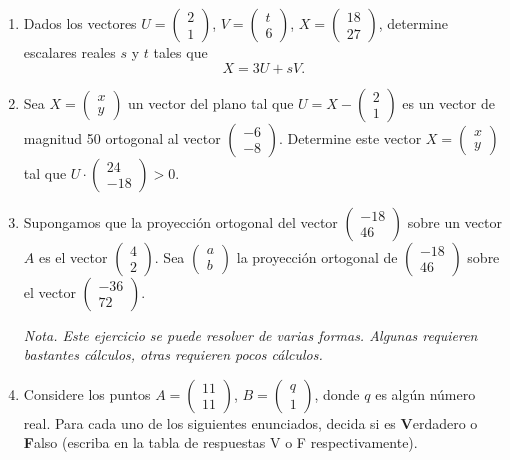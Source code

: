 \documentclass[11pt]{article}
\newcommand{\vect}[2]{\begin{pmatrix}#1\\#2\end{pmatrix}}
\newcommand{\nota}[1]{{\small\itshape\color{unalblue!70!black} #1}}
\begin{document}
\begin{enumerate}
\item Dados los vectores $U=\vect{2}{1}$, $V=\vect{t}{6}$, $X=\vect{18}{27}$, determine escalares reales $s$ y $t$ tales que
$$X=3U+sV.$$


\item Sea $X=\vect{x}{y}$ un vector del plano tal que $U=X-\vect{2}{1}$ es un vector de magnitud 50 ortogonal al vector $\vect{-6}{-8}$. Determine este vector $X=\vect{x}{y}$ tal que $U\cdot\vect{24}{-18}>0$.


\item Supongamos que la proyección ortogonal del vector $\vect{-18}{46}$ sobre un vector $A$ es el vector $\vect{4}{2}$. Sea $\vect{a}{b}$ la proyección ortogonal de $\vect{-18}{46}$ sobre el vector $\vect{-36}{72}$.


\nota{Nota. Este ejercicio se puede resolver de varias formas. Algunas requieren bastantes cálculos, otras requieren pocos cálculos.}

\item Considere los puntos $A=\vect{11}{11}$, $B=\vect{q}{1}$, donde $q$ es algún número real. Para cada uno de los siguientes enunciados, decida si es \textbf{V}erdadero o \textbf{F}also (escriba en la tabla de respuestas V o F respectivamente).



\end{enumerate}
\end{document}

